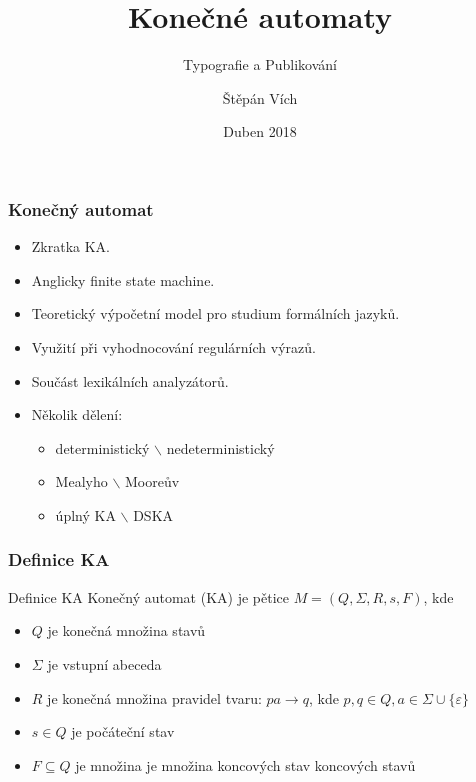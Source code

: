 \documentclass{beamer}
\title{Konečné automaty}
\subtitle{Typografie a Publikování}
\author{Štěpán Vích}
\institute{Vysoké učení technické v~Brně \\ Fakulta informačních technologií}
\date{Duben 2018}
\begin{document}
\frame{\titlepage}

\begin{frame}
\frametitle{Konečný automat}

\begin{itemize}
    \item Zkratka KA.
    \item Anglicky finite state machine.
    \item Teoretický výpočetní model pro studium formálních jazyků.
    \item Využití při vyhodnocování regulárních výrazů.
    \item Součást lexikálních analyzátorů.
    \item Několik dělení: 
    \begin{itemize}
        \item deterministický $\backslash$ nedeterministický 
        \item Mealyho $\backslash$ Mooreův
        \item úplný KA $\backslash$ DSKA
    \end{itemize}
\end{itemize}


\end{frame}

\begin{frame}
\frametitle{Definice KA}

\begin{block}{Definice KA}
Konečný automat (KA) je pětice $M = (Q, \Sigma, R, s, F)$, kde
\begin{itemize}
    \item $Q$ je konečná množina stavů
    \item $\Sigma$ je vstupní abeceda
    \item $R$ je konečná množina pravidel tvaru: $pa \rightarrow q$, kde $p, q \in Q, a \in \Sigma \cup \{\varepsilon\}$
    \item $s \in Q$ je počáteční stav
    \item $F \subseteq Q$ je množina je množina koncových stav koncových stavů
\end{itemize}

\end{block}

\end{frame}
\end{document}
